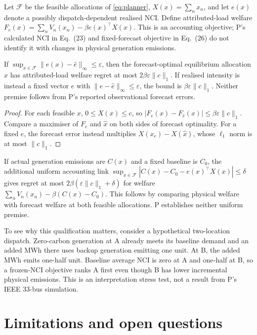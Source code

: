 \documentclass{article}
\begin{document}
Let \(\mathcal F\) be the feasible allocations of \eqref{eq:planner}, \(X(x)=\sum_n x_n\), and let \(e(x)\) denote a possibly dispatch-dependent realised NCI. Define attributed-load welfare \(F_e(x)=\sum_n V_n(x_n)-\beta e(x)^\top X(x)\). This is an accounting objective; P's calculated NCI in Eq.~(23) and fixed-forecast objective in Eq.~(26) do not identify it with changes in physical generation emissions. %

\begin{proposition}
If \(\sup_{x\in\mathcal F}\|e(x)-\hat e\|_\infty\leq\varepsilon\), then the forecast-optimal equilibrium allocation \(\hat x\) has attributed-load welfare regret at most \(2\beta\varepsilon\|c\|_1\). If realised intensity is instead a fixed vector \(e\) with \(\|e-\hat e\|_\infty\leq\varepsilon\), the bound is \(\beta\varepsilon\|c\|_1\). Neither premise follows from P's reported observational forecast errors. %
\end{proposition}
\begin{proof}
For each feasible \(x\), \(0\leq X(x)\leq c\), so \(|F_e(x)-F_{\hat e}(x)|\leq\beta\varepsilon\|c\|_1\). Compare a maximiser of \(F_e\) and \(\hat x\) on both sides of forecast optimality. For a fixed \(e\), the forecast error instead multiplies \(X(x_e)-X(\hat x)\), whose \(\ell_1\) norm is at most \(\|c\|_1\). %
\end{proof}

If actual generation emissions are \(C(x)\) and a fixed baseline is \(C_0\), the additional uniform accounting link \(\sup_{x\in\mathcal F}|C(x)-C_0-e(x)^\top X(x)|\leq\delta\) gives regret at most \(2\beta(\varepsilon\|c\|_1+\delta)\) for welfare \(\sum_n V_n(x_n)-\beta(C(x)-C_0)\). This follows by comparing physical welfare with forecast welfare at both feasible allocations. P establishes neither uniform premise. %

To see why this qualification matters, consider a hypothetical two-location dispatch. Zero-carbon generation at A already meets its baseline demand and an added MWh there uses backup generation emitting one unit. At B, the added MWh emits one-half unit. Baseline average NCI is zero at A and one-half at B, so a frozen-NCI objective ranks A first even though B has lower incremental physical emissions. This is an interpretation stress test, not a result from P's IEEE 33-bus simulation. %

\section{Limitations and open questions}
\end{document}

